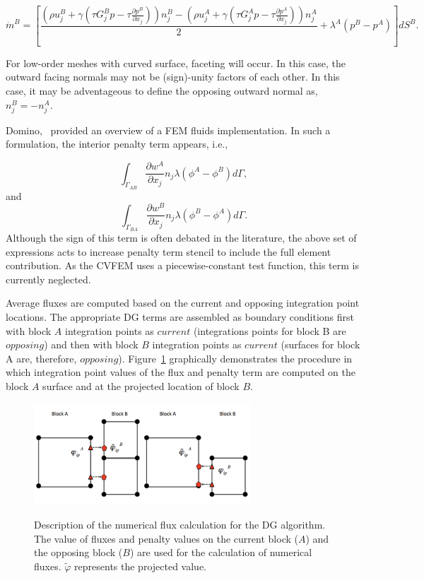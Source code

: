 {\begin{equation} 
        \dot {m}^B = [\frac{(\rho u_j^B + \gamma(\tau G_j^B p -\tau \frac{\partial p^B}{\partial x_j}))n_j^B
        				       - (\rho u_j^A + \gamma(\tau G_j^A p -\tau \frac{\partial p^A}{\partial x_j}))n_j^A}{2}
				       + \lambda^A ( p^B - p^A)] dS^B.
\label{mdotB}
\end{equation}

For low-order meshes with curved surface, faceting will occur. In this case, the outward facing normals may 
not be (sign)-unity factors of each other. In this case, it may be adventageous to define the opposing 
outward normal as, $n_j^B = -n_j^A$. 

Domino,~\cite{Domino:2010} provided an overview of a FEM fluids implementation. In such a formulation, the
interior penalty term appears, i.e.,

\begin{equation} 
   \int_{\Gamma_{AB}} \frac {\partial w^A}{\partial x_j} n_j \lambda (\phi^A-\phi^B) d\Gamma,
\end{equation}
and
\begin{equation} 
   \int_{\Gamma_{BA}} \frac {\partial w^B}{\partial x_j} n_j \lambda (\phi^B-\phi^A) d\Gamma.
\end{equation}
Although the sign of this term is often debated in the literature, the above set of expressions acts 
to increase penalty term stencil to include the full element contribution. 
As the CVFEM uses a piecewise-constant test function, this term is currently neglected.

Average fluxes are computed based on the current and opposing integration point locations. The 
appropriate DG terms are assembled as boundary conditions first with block $A$ integration 
points as $current$ (integrations points for block B are $opposing$) and then with block $B$ 
integration points as $current$ (surfaces for block A are, therefore, $opposing$). Figure~\ref{nonConformal} 
graphically demonstrates the procedure in which integration point values of the flux and penalty 
term are computed on the block $A$ surface and at the projected location of block $B$. 

\begin{figure}
\centering
  {\includegraphics[height=1.5in]{images/contactSearchAndEval.pdf}}
  \vspace{0.25in}
  \caption{Description of the numerical flux calculation for the DG algorithm. The 
    value of fluxes and penalty values on the current block ($A$) and the opposing block ($B$) are used 
    for the calculation of numerical fluxes. $\tilde \varphi$ represents the projected value.}
  \label{nonConformal}
\end{figure}

}
